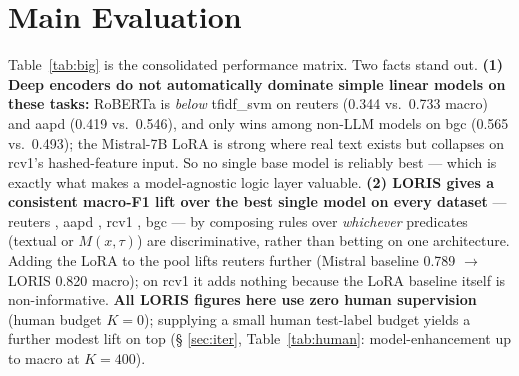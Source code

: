 \documentclass[11pt]{article}
\begin{document}
\section{Main Evaluation}
\label{sec:main}
Table~\ref{tab:big} is the consolidated performance matrix. Two facts stand out. \textbf{(1) Deep encoders
do not automatically dominate simple linear models on these tasks:} RoBERTa is \emph{below} tfidf\_svm on
reuters (0.344 vs.\ 0.733 macro) and aapd (0.419 vs.\ 0.546), and only wins among non-LLM models on bgc
(0.565 vs.\ 0.493); the Mistral-7B LoRA is strong where real text exists but collapses on rcv1's
hashed-feature input. So no single base model is reliably best --- which is exactly what makes a
model-agnostic logic layer valuable. \textbf{(2) LORIS gives a consistent macro-F1 lift over the best
single model on every dataset} --- reuters , aapd , rcv1 , bgc
 --- by composing rules over \emph{whichever} predicates (textual or $M(x,\tau)$) are
discriminative, rather than betting on one architecture. Adding the LoRA to the pool lifts reuters
further (Mistral baseline 0.789 $\to$ LORIS 0.820 macro); on rcv1 it adds nothing because the LoRA
baseline itself is non-informative. \textbf{All LORIS figures here use zero human supervision} (human
budget $K{=}0$); supplying a small human test-label budget yields a further modest lift on top (\S
\ref{sec:iter}, Table~\ref{tab:human}: model-enhancement up to  macro at $K{=}400$).
\end{document}
